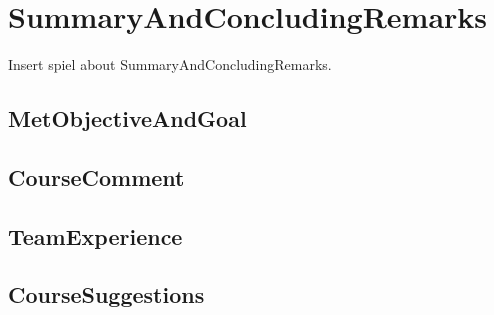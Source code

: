 

\chapter{SummaryAndConcludingRemarks}
Insert spiel about SummaryAndConcludingRemarks.

\section{MetObjectiveAndGoal}


\section{CourseComment}


\section{TeamExperience}


\section{CourseSuggestions}

